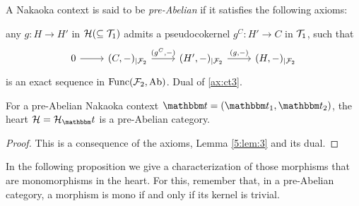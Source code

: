 \begin{definition}
A Nakaoka context is said to be \emph{pre-Abelian} if it satisfies the following axioms:
\begin{torsionaxioms}\setcounter{enumi}{2}
\item\label{ax:ct3} any  $g\colon H\to H'$ in $\mathcal{H}(\subseteq \mathcal{T}_1)$ admits a pseudocokernel $g^C\colon H'\to C$ in $\mathcal{T}_1$, such that
\begin{equation*}
\begin{tikzcd}
0\arrow{r} &(C,-)_{|\F_2}\arrow{r}{(g^C,-)} & (H',-)_{|\F_2}\arrow{r}{(g,-)}& (H,-)_{|\F_2}
\end{tikzcd}
\end{equation*}
is an exact sequence in $\mathrm{Func}(\mathcal{F}_2,\mathrm{Ab})$.
\varitem{^\ast}\label{ax:ct3op} Dual of \ref{ax:ct3}.
\end{torsionaxioms}
\end{definition}

\begin{thm}\label{pre_abelian_theorem}
For a pre-Abelian Nakaoka context $\t=(\t_1,\t_2)$, the heart $\clH=\clH_\t$ is a pre-Abelian category.
\end{thm}
\begin{proof}
This is a consequence of the axioms, Lemma \ref{5:lem:3} and its dual.
\end{proof}

In the following proposition we give a characterization of those morphisms that are monomorphisms in the heart. For this, remember that, in a pre-Abelian category, a morphism is mono if and only if its kernel is trivial.

